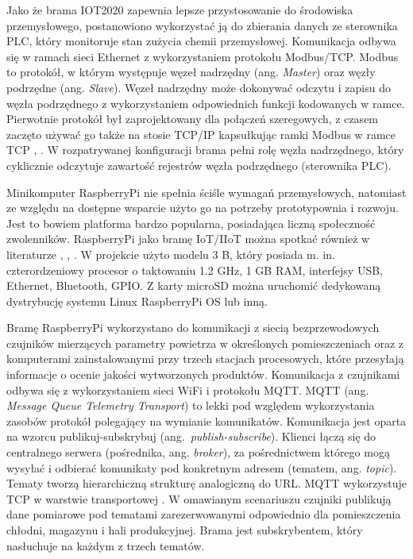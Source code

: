 \documentclass[a4paper, 12pt, twoside]{article}
\begin{document}
Jako że brama IOT2020 zapewnia lepsze przystosowanie do środowiska przemysłowego,
postanowiono wykorzystać ją do zbierania danych ze sterownika PLC, który
monitoruje stan zużycia chemii przemysłowej. Komunikacja odbywa się w ramach
sieci Ethernet z wykorzystaniem protokołu Modbus/TCP. Modbus to protokół,
w którym występuje węzeł nadrzędny (ang. \emph{Master}) oraz węzły
podrzędne (ang. \emph{Slave}). Węzeł nadrzędny może dokonywać odczytu i zapisu
do węzła podrzędnego z wykorzystaniem odpowiednich funkcji kodowanych w ramce.
Pierwotnie protokół był zaprojektowany dla połączeń szeregowych, z czasem
zaczęto używać go także na stosie TCP/IP kapsułkując ramki Modbus w ramce TCP
\cite{isp}, \cite{isp-analiza-przepływu-informacji}. W rozpatrywanej konfiguracji
brama pełni rolę węzła nadrzędnego, który cyklicznie odczytuje zawartość
rejestrów węzła podrzędnego (sterownika PLC).

Minikomputer RaspberryPi nie spełnia ściśle wymagań przemysłowych, natomiast ze
względu na dostępne wsparcie użyto go na potrzeby prototypownia i rozwoju.
Jest to bowiem platforma bardzo popularna, posiadająca liczną społeczność zwolenników.
RaspberryPi jako bramę IoT/IIoT można spotkać również w literaturze \cite{iiot-opensource-gateway},
\cite{design-impl-node-gateway}, \cite{low-cost-esp32-pi-node-red-scada}.
W projekcie użyto modelu 3 B, który posiada m. in. czterordzeniowy
procesor o taktowaniu 1.2 GHz, 1 GB RAM, interfejsy USB, Ethernet, Bluetooth, GPIO.
Z karty microSD można uruchomić dedykowaną dystrybucję systemu Linux RaspberryPi OS lub inną.

Bramę RaspberryPi wykorzystano do komunikacji z siecią bezprzewodowych czujników
mierzących parametry powietrza w określonych pomieszczeniach oraz z
komputerami zainstalowanymi przy trzech stacjach procesowych, które
przesyłają informacje o ocenie jakości wytworzonych produktów.
Komunikacja z czujnikami odbywa się z wykorzystaniem sieci WiFi i protokołu
MQTT. MQTT (ang. \emph{Message Queue Telemetry Transport}) to lekki pod względem wykorzystania zasobów
protokół polegający na wymianie komunikatów. Komunikacja
jest oparta na wzorcu publikuj-subskrybuj (ang.~\emph{publish-subscribe}).
Klienci łączą się do centralnego serwera (pośrednika, ang. \emph{broker}), za pośrednictwem
którego mogą wysyłać i odbierać komunikaty pod konkretnym adresem (tematem, ang. \emph{topic}).
Tematy tworzą hierarchiczną strukturę analogiczną do URL. MQTT
wykorzystuje TCP w warstwie transportowej \cite{iot-hype-to-reality}. W omawianym
scenariuszu czujniki publikują dane pomiarowe pod tematami zarezerwowanymi
odpowiednio dla pomieszczenia chłodni, magazynu i hali produkcyjnej. Brama
jest subskrybentem, który nasłuchuje na każdym z trzech tematów. 
\end{document}
